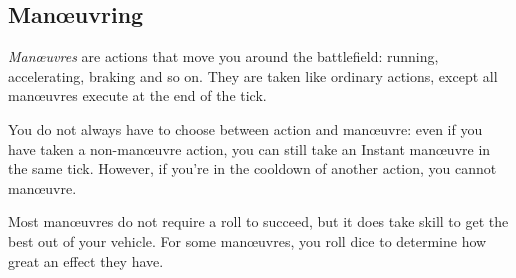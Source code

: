 
\subsection{Man\oe{}uvring}
\emph{Man\oe{}uvres} are actions that move you around the battlefield: running, accelerating, braking and so on. They are taken like ordinary actions, except all man\oe{}uvres execute at the end of the tick.

You do not always have to choose between action and man\oe{}uvre: even if you have taken a non-man\oe{}uvre action, you can still take an Instant man\oe{}uvre in the same tick. However, if you're in the cooldown of another action, you cannot man\oe{}uvre.

Most man\oe{}uvres do not require a roll to succeed, but it does take skill to get the best out of your vehicle. For some man\oe{}uvres, you roll dice to determine how great an effect they have.
